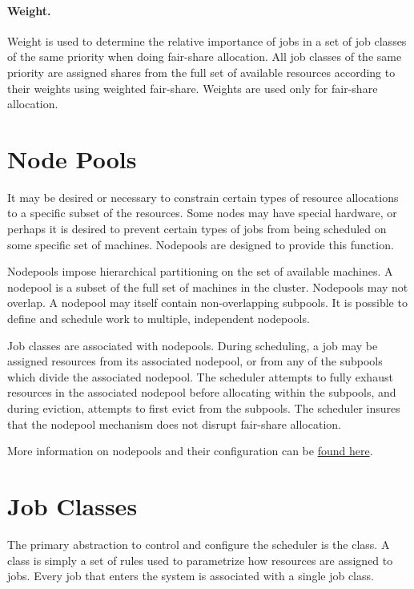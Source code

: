     \paragraph{Weight.} Weight is used to determine the relative importance of jobs in a set of job classes of 
    the same priority when doing fair-share allocation. All job classes of the same priority are assigned 
    shares from the full set of available resources according to their weights using weighted fair-share. 
    Weights are used only for fair-share allocation. 
    
    \section{Node Pools}
    It may be desired or necessary to constrain certain types of resource allocations to a specific
    subset of the resources. Some nodes may have special hardware, or perhaps it is desired to
    prevent certain types of jobs from being scheduled on some specific set of machines. Nodepools
    are designed to provide this function.

    Nodepools impose hierarchical partitioning on the set of available machines. A nodepool is a
    subset of the full set of machines in the cluster. Nodepools may not overlap. A nodepool may
    itself contain non-overlapping subpools.  It is possible to define and schedule work to
    multiple, independent nodepools.

    Job classes are associated with nodepools. During scheduling, a job may be assigned resources
    from its associated nodepool, or from any of the subpools which divide the associated nodepool.
    The scheduler attempts to fully exhaust resources in the associated nodepool before allocating
    within the subpools, and during eviction, attempts to first evict from the subpools. The
    scheduler insures that the nodepool mechanism does not disrupt fair-share allocation.
    
    More information on nodepools and their configuration can be \hyperref[subsec:nodepools]{found here}.

    \section{Job Classes}
    \label{sec:rm.job-classes}
    The primary abstraction to control and configure the scheduler is the class. A class is simply a set 
    of rules used to parametrize how resources are assigned to jobs. Every job that enters the system is 
    associated with a single job class. 
    
